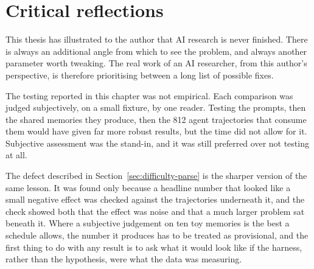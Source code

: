 \section{Critical reflections}

This thesis has illustrated to the author that AI research is never finished. There is always an additional angle from which to see the problem, and always another parameter worth tweaking. The real work of an AI researcher, from this author's perspective, is therefore prioritising between a long list of possible fixes.

The testing reported in this chapter was not empirical. Each comparison was judged subjectively, on a small fixture, by one reader. Testing the prompts, then the shared memories they produce, then the 812 agent trajectories that consume them would have given far more robust results, but the time did not allow for it. Subjective assessment was the stand-in, and it was still preferred over not testing at all.

The defect described in Section~\ref{sec:difficulty-parse} is the sharper version of the same lesson. It was found only because a headline number that looked like a small negative effect was checked against the trajectories underneath it, and the check showed both that the effect was noise and that a much larger problem sat beneath it. Where a subjective judgement on ten toy memories is the best a schedule allows, the number it produces has to be treated as provisional, and the first thing to do with any result is to ask what it would look like if the harness, rather than the hypothesis, were what the data was measuring.
